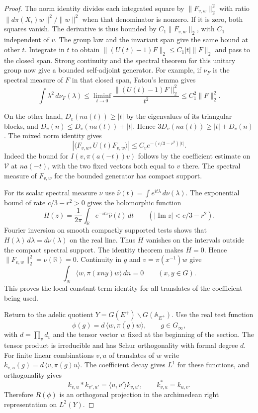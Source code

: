 \begin{proof}
The norm identity divides each integrated square by
\(\|F_{v,w}\|_2^2\) with ratio
\(\|d\pi(X_i)w\|^2/\|w\|^2\) when that denominator is nonzero.
If it is zero, both squares vanish. The derivative is thus bounded
by \(C_1\|F_{v,w}\|_2\), with \(C_1\) independent of \(v\).
The group law and the invariant span give the same bound at other
\(t\). Integrate in \(t\) to obtain
\(\|(U(t)-1)F\|_2\le C_1|t|\|F\|_2\) and pass to the closed span.
Strong continuity and the spectral theorem for this unitary
group now give a bounded self-adjoint generator. For example,
if \(\nu_F\) is the spectral measure of \(F\) in that closed span,
Fatou's lemma gives
\[
 \int \lambda^2\,d\nu_F(\lambda)
 \le\liminf_{t\to0}\frac{\|(U(t)-1)F\|_2^2}{t^2}
 \le C_1^2\|F\|_2^2.
\]

On the other hand, \(D_v(na(t))\ge|t|\) by the eigenvalues
of its triangular blocks, and
\(D_v(n)\le D_v(na(t))+|t|\). Hence
\(3D_v(na(t))\ge|t|+D_v(n)\).
The mixed norm identity gives
\[
   |\langle F_{v,w},U(t)F_{v,w}\rangle|
      \le C_v e^{-(c/3-r^2)|t|}.
\]
Indeed the bound for \(I(v,\pi(a(-t))v)\) follows by the
coefficient estimate on \(\mathcal V\) at \(na(-t)\), with
the two fixed vectors both equal to \(v\) there. The spectral
measure of \(F_{v,w}\) for the bounded generator has compact
support.

For its scalar spectral measure \(\nu\) use
\(\widehat\nu(t)=\int e^{it\lambda}\,d\nu(\lambda)\).
The exponential bound of rate \(c/3-r^2>0\) gives the
holomorphic function
\[
 H(z)=\frac1{2\pi}\int_{\mathbb R}
                e^{-itz}\widehat\nu(t)\,dt
       \qquad (|\operatorname{Im}z|<c/3-r^2).
\]
Fourier inversion on smooth compactly supported tests shows
that \(H(\lambda)\,d\lambda=d\nu(\lambda)\) on the real line.
Thus \(H\) vanishes on the intervals outside the compact
spectral support. The identity theorem makes \(H=0\).
Hence \(\|F_{v,w}\|_2^2=\nu(\mathbb R)=0\).
Continuity in \(g\) and \(v=\pi(x^{-1})w\) give
\[
     \int_N\langle w,\pi(xny)w\rangle\,dn=0
               \qquad (x,y\in G).
\]
This proves the local constant-term identity for all translates
of the coefficient being used.

Return to the adelic quotient \(Y=G(E^+)\backslash
G(\mathbb A_{E^+})\). Use the real test function
\[
 \phi(g)=d\,\overline{\langle w,\pi(g)w\rangle},
 \qquad g\in G_\infty,
\]
with
\(d=\prod_v d_v\) and the tensor vector \(w\) fixed at the
beginning of the section. The tensor product is irreducible
and has Schur orthogonality with formal degree \(d\).
For finite linear combinations \(v,u\) of translates of \(w\)
write \(k_{v,u}(g)=d\,\overline{\langle v,\pi(g)u\rangle}\).
The coefficient decay gives \(L^1\) for these functions, and
orthogonality gives
\[
  k_{v,u}*k_{v',u'}=\langle u,v'\rangle k_{v,u'},
       \qquad k_{v,u}^*=k_{u,v}.
\]
Therefore \(R(\phi)\) is an orthogonal projection in the
archimedean right representation on \(L^2(Y)\).


\end{proof}
